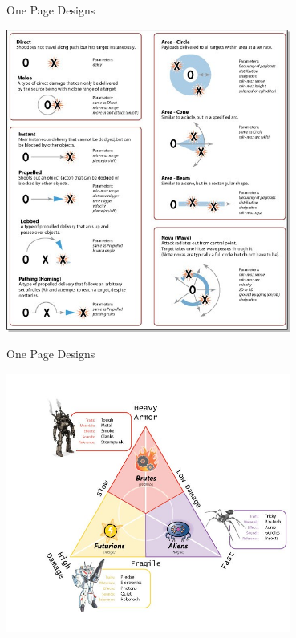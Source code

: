 \begin{frame}{One Page Designs}
	\begin{center}
		\includegraphics[width=0.7\textwidth,height=0.7\textheight]{combat_diagram}
	\end{center}
\end{frame}

\begin{frame}{One Page Designs}
	\begin{center}
		\includegraphics[width=0.7\textwidth,height=0.7\textheight]{unit_diagram}
	\end{center}
\end{frame}

